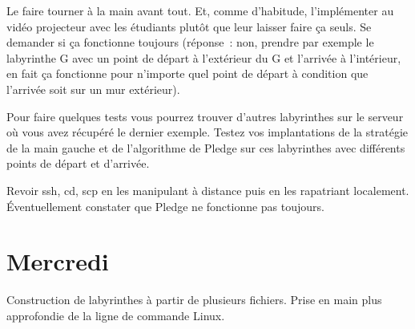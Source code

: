 \documentclass[a4paper]{article}
\newenvironment{objectif}{%
  \begin{framed}%
  \noindent{\bf Objectifs du jour~:}%
}{%
  \end{framed}%
}
\newenvironment{enseignants}[1]{\noindent\color{blue}{\bf #1}}{}
\begin{document}
\begin{enseignants}{Sur l'algorithme de Pledge~:}
  Le faire tourner à la main avant tout.
  Et, comme d'habitude, l'implémenter au vidéo projecteur avec les étudiants plutôt que leur laisser faire ça seuls.
  Se demander si ça fonctionne toujours (réponse~: non, prendre par exemple le labyrinthe G avec un point de départ à l'extérieur du G et l'arrivée à l'intérieur, en fait ça fonctionne pour n'importe quel point de départ à condition que l'arrivée soit sur un mur extérieur).
\end{enseignants}

Pour faire quelques tests vous pourrez trouver d'autres labyrinthes sur le serveur où vous avez récupéré le dernier exemple.
Testez vos implantations de la stratégie de la main gauche et de l'algorithme de Pledge sur ces labyrinthes avec différents points de départ et d'arrivée.

\begin{enseignants}{But de ces nouveaux labyrinthes~:}
  Revoir ssh, cd, scp en les manipulant à distance puis en les rapatriant localement.
  Éventuellement constater que Pledge ne fonctionne pas toujours.
\end{enseignants}




\section{Mercredi}

\begin{objectif}
  Construction de labyrinthes à partir de plusieurs fichiers.
  Prise en main plus approfondie de la ligne de commande Linux.
\end{objectif}
\end{document}
